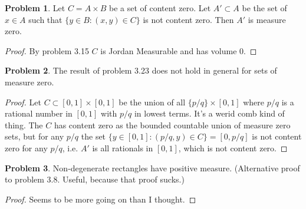 \documentclass[20pt]{article}
\theoremstyle{plain}
\theoremstyle{definition}
\newtheorem*{problem}{Problem}
\begin{document}
\begin{problem}{3.23}
  Let $C = A \times B$ be a set of content zero.
  Let $A' \subset A$ be the set of $x \in A$ such that 
  $\{ y \in B: (x, y) \in C \}$ is not content zero.
  Then $A'$ is measure zero.
\end{problem}
\begin{proof}
  By problem 3.15 $C$ is Jordan Measurable and has volume $0$.
\end{proof}



\begin{problem}{3.24}
  The result of problem 3.23 does not hold in general for sets of measure zero.
\end{problem}

\begin{proof}
  Let $C\subset [0,1] \times [0,1]$ be the union of all 
  $\{ p/q \} \times [0, 1]$ where $p/q$ is a rational number in $[0, 1]$ with 
  $p/q$ in lowest terms. It's a werid comb kind of thing.
  The $C$ has content zero as the bounded countable union of measure zero sets, but 
  for any $p/q$ the set $\{ y \in [0, 1]: (p/q, y) \in C \} = [0, p/q]$
  is not content zero for any $p/q$, i.e. $A'$ is all rationals in $[0,1]$, which 
  is not content zero.
\end{proof}



\begin{problem}{3.25}
  Non-degenerate rectangles have positive measure.
  (Alternative proof to problem 3.8.  Useful, because that proof sucks.)
\end{problem}

\begin{proof}
  \color{ForestGreen}
  Seems to be more going on than I thought.
\end{proof}
  
\end{document}
